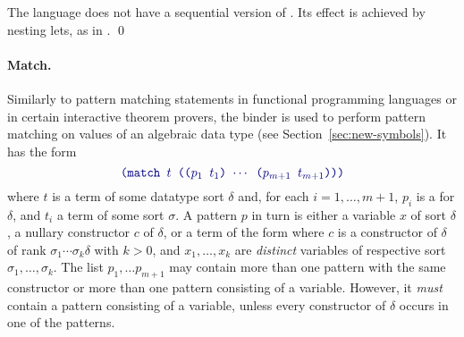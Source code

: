 \begin{remark}
The language does not have a sequential version of .
Its effect is achieved by nesting lets, as in 
.
\qed
\end{remark}

\paragraph{Match.}
Similarly to pattern matching statements in functional programming languages
or in certain interactive theorem provers,
the  binder is used to perform pattern matching on values 
of an algebraic data type (see Section~\ref{sec:new-symbols}).
It has the form
%
\begin{equation} \label{eq:match}
\expr{(match $t$ (($p_1$ $t_1$) $\cdots$ ($p_{m+1}$ $t_{m+1}$)))}
\end{equation}
%
where $t$ is a term of some datatype sort $\delta$ and,
for each $i=1,\ldots,m+1$,
$p_i$ is a  for $\delta$, and $t_i$ a term of some sort $\sigma$.
A pattern $p$ in turn is either a variable $x$ of sort $\delta$, 
a nullary constructor $c$ of $\delta$, 
or a term of the form 
where $c$ is a constructor of $\delta$ of rank
$\sigma_1\cdots\sigma_k\delta$ 
with $k > 0$, and $x_1, \ldots, x_k$ are \emph{distinct} variables 
of respective sort $\sigma_1,\ldots,\sigma_k$.
The list $p_1,\ldots p_{m+1}$ may contain more than one pattern with the same constructor 
or more than one pattern consisting of a variable.
However, it \emph{must} contain a pattern consisting of a variable, 
unless every constructor of $\delta$ occurs in one of the patterns.




